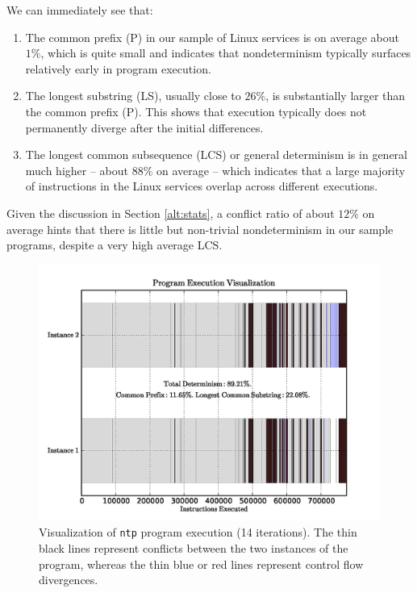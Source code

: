 \newpage 
We can immediately see that:
\begin{enumerate}
\item The common prefix (P) 
in our sample of Linux services is on average about $1\%$,
which is quite small and indicates that nondeterminism 
typically surfaces relatively early in program execution. 

\item The longest substring (LS), usually close to $26\%$,
is substantially larger than the common prefix (P).
This shows that execution typically does not permanently
diverge after the initial differences.

\item The longest common subsequence (LCS) or general determinism
is in general much higher -- about $88\%$ on average -- 
which indicates that a large majority of instructions 
in the Linux services overlap across
different executions. 
\end{enumerate}

\noindent Given the discussion in Section \ref{alt:stats}, a conflict ratio
of about $12\%$ on average hints that there is little but non-trivial nondeterminism 
in our sample programs, despite a very high average LCS.

\begin{figure}
  \center
  \includegraphics[trim=4cm 0cm 0cm 0cm, width=1.1\textwidth]{ntp-ch2.png}
  \caption[Visualization of \texttt{ntp} program execution (14 iterations)]%
          {Visualization of \texttt{ntp} program execution (14 iterations).
          The thin black lines represent conflicts between
          the two instances of the program, whereas
          the thin blue or red lines represent control flow
          divergences.}
  \label{ntp:tracech2}
\end{figure} 

